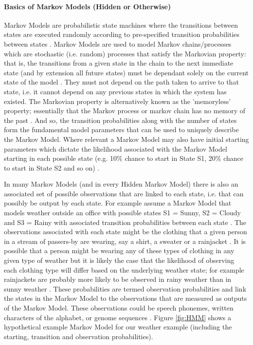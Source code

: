 \documentclass[]{article}
\begin{document}
\paragraph{Basics of Markov Models (Hidden or Otherwise)}

Markov Models are probabilistic state machines where the transitions between states are executed randomly according to pre-specified transition probabilities between states \cite{Jurafsky2017,Bobick2015,Gagniuc2017,OConnell2011,Rabiner1989}. Markov Models are used to model Markov chains/processes which are stochastic (i.e. random) processes that satisfy the Markovian property: that is, the transitions from a given state in the chain to the next immediate state (and by extension all future states) must be dependant solely on the current state of the model \cite{Jurafsky2017,Bobick2015,Bobick2015a,Gagniuc2017,OConnell2011,Rabiner1989}. They must not depend on the path taken to arrive to that state, i.e. it cannot depend on any previous states in which the system has existed. The Markovian property is alternatively known as the 'memoryless' property; essentially that the Markov process or markov chain has no memory of the past \cite{Jurafsky2017,Bobick2015,Bobick2015a,Gagniuc2017,OConnell2011,Rabiner1989}. And so, the transition probabilities along with the number of states form the fundamental model parameters that can be used to uniquely describe the Markov Model. Where relevant a Markov Model may also have initial starting parameters which dictate the likelihood associated with the Markov Model starting in each possible state (e.g. 10\% chance to start in State S1, 20\% chance to start in State S2 and so on) \cite{Jurafsky2017,Bobick2015,Bobick2015a,Gagniuc2017,OConnell2011,Rabiner1989}.

In many Markov Models (and in every Hidden Markov Model) there is also an associated set of possible observations that are linked to each state, i.e. that can possibly be output by each state. For example assume a Markov Model that models weather outside an office with possible states S1 = Sunny, S2 = Cloudy and S3 = Rainy with associated transition probabilities between each state \cite{Bobick2015}. The observations associated with each state might be the clothing that a given person in a stream of passers-by are wearing, say a shirt, a sweater or a rainjacket \cite{Bobick2015}. It is possible that a person might be wearing any of these types of clothing in any given type of weather but it is likely the case that the likelihood of observing each clothing type will differ based on the underlying weather state; for example rainjackets are probably more likely to be observed in rainy weather than in sunny weather \cite{Bobick2015}. These probabilities are termed observation probabilities and link the states in the Markov Model to the observations that are measured as outputs of the Markov Model. These observations could be speech phonemes, written characters of the alphabet, or genome sequences \cite{Rabiner1989,Altman2007}. Figure \ref{fig:HMM} shows a hypothetical example Markov Model for our weather example (including the starting, transition and observation probabilities).
\end{document}
